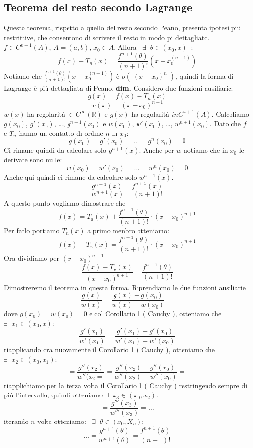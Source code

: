 \subsection*{Teorema del resto secondo Lagrange}
Questo teorema, rispetto a quello del resto secondo Peano, presenta ipotesi più restrittive, che consentono di scrivere il resto in modo pi dettagliato.\newline
$f \in C^{n+1}(A)$, $A=(a,b)$, $x_0 \in A$, Allora $\;\;\exists\;\; \theta \in (x_0, x) \;\;:\;\; $
\[
    f(x) -T_n(x) = \frac{f^{n+1}(\theta)}{(n+1)!}(x-x_0^{(n+1)})
\]
Notiamo che $\frac{f^{n+1}(\theta)}{(n+1)!}(x-x_0^{(n+1)})$ è $o( \; (x-x_0)^n \;)$, quindi la forma di Lagrange è più dettagliata di Peano.\newline
\newline
\textbf{dim.} Considero due funzioni ausiliarie:
\[
    g(x) = f(x) - T_n(x)
\]
\[
    w(x) = (x-x_0)^{n+1}
\]
$w(x)$ ha regolarità $ \in C^\infty ( \mathbb{R})$ e $g(x)$ ha regolarità $in C^{n+1}(A)$.\newline
Calcoliamo $g(x_0)$, $g'(x_0)$, \dots, $g^{n+1}(x_0)$ e $w(x_0)$, $w'(x_0)$, \dots, $w^{n+1}(x_0)$.\newline
Dato che $f$ e $T_n$ hanno un contatto di ordine $n$ in $x_0$:
\[
    g(x_0) = g'(x_0) = \dots = g^{n}(x_0) = 0
\]
Ci rimane quindi da calcolare solo $g^{n+1}(x)$.\newline
Anche per $w$ notiamo che in $x_0$ le derivate sono nulle:
\[
    w(x_0) = w'(x_0) = \dots = w^{n}(x_0) = 0
\]
Anche qui quindi ci rimane da calcolare solo $w^{n+1}(x)$.
\[
    g^{n+1}(x) = f^{n+1}(x)
\]
\[
    w^{n+1}(x) = (n+1)!
\]
A questo punto vogliamo dimostrare che
\[
    f(x) = T_n(x) + \frac{f^{n+1}(\theta)}{(n+1)!} \cdot (x-x_0)^{n+1}
\] 
Per farlo portiamo $T_n(x)$ a primo menbro otteniamo:
\[
    f(x) - T_n(x) = \frac{f^{n+1}(\theta)}{(n+1)!} \cdot (x-x_0)^{n+1}
\]
Ora dividiamo per $(x-x_0)^{n+1}$
\[
    \frac{f(x) - T_n(x)}{(x-x_0)^{n+1}} = \frac{f^{n+1}(\theta)}{(n+1)!}
\]
Dimostreremo il teorema in questa forma.\newline
\newline
Riprendiamo le due funzioni ausiliarie
\[
    \frac{g(x)}{w(x)} = \frac{ g(x) - g(x_0)}{ w(x) - w(x_0)} = 
\]
dove $g(x_0) = w(x_0) = 0$ e col Corollario 1 ( Cauchy ), otteniamo che $\exists\;\; x_1 \in(x_0, x)$:
\[
    = \frac{g'(x_1)}{w'(x_1)} = \frac{g'(x_1) -g'(x_0)}{w'(x_1)- w'(x_0)} =
\]
riapplicando ora nuovamente il Corollario 1 ( Cauchy ), otteniamo che $\exists\;\; x_2 \in(x_0, x_1)$:
\[
    = \frac{g''(x_2)}{w''(x_2=} = \frac{ g''(x_2) - g''(x_0)}{w''(x_2)- w''(x_0)} =
\]
riapplichiamo per la terza volta il Corollario 1 ( Cauchy ) restringendo sempre di più l'intervallo, quindi otteniamo $\exists\;\; x_3 \in (x_0, x_2)$:
\[
    = \frac{g'''(x_3)}{w'''(x_3)} = \dots
\]
iterando $n$ volte otteniamo:\newline
$\;\;\exists\;\; \theta \in (x_0, X_n)$:
\[
    \dots = \frac{g^{n+1}(\theta)}{w^{n+1}(\theta)} = \frac{f^{n+1} ( \theta)}{(n+1)!}
\]
\newpage